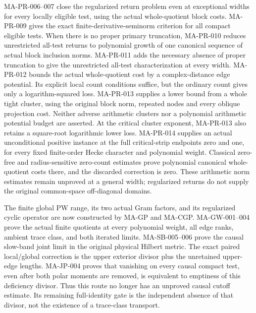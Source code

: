 \documentclass[11pt,a4paper]{article}
\begin{document}
MA-PR-006--007 close the regularized return problem even at
exceptional widths for every locally eligible test, using the
actual whole-quotient block costs. MA-PR-009 gives the exact
finite-derivative-seminorm criterion for all compact eligible
tests. When there is no proper primary truncation, MA-PR-010
reduces unrestricted all-test returns to polynomial growth of
one canonical sequence of actual block inclusion norms.
MA-PR-011 adds the necessary absence of proper truncation to give
the unrestricted all-test characterization at every width.
MA-PR-012 bounds the actual whole-quotient cost by a complex-distance
edge potential. Its explicit local count conditions suffice, but
the ordinary count gives only a logarithm-squared loss.
MA-PR-013 supplies a lower bound from a whole tight cluster,
using the original block norm, repeated nodes and every oblique
projection cost. Neither adverse arithmetic clusters nor a
polynomial arithmetic potential budget are asserted.
At the critical cluster exponent, MA-PR-013 also retains a
square-root logarithmic lower loss. MA-PR-014 supplies an actual
unconditional positive instance at the full critical-strip
endpoints zero and one, for every fixed finite-order Hecke
character and polynomial weight. Classical zero-free and
radius-sensitive zero-count estimates prove polynomial canonical
whole-quotient costs there, and the discarded correction is zero.
These arithmetic norm estimates remain unproved at a general
width; regularized returns do not supply the original
common-space off-diagonal domains.

The finite global PW range, its two actual Gram factors, and its
regularized cyclic operator are now constructed by MA-GP and
MA-CGP. MA-GW-001--004 prove the actual finite quotients at every
polynomial weight, all edge ranks, ambient trace class, and both
iterated limits. MA-SB-005--006 prove the causal slow-band joint
limit in the original physical Hilbert metric. The exact paired
local/global correction is the upper exterior divisor plus the
unretained upper-edge lengths. MA-JP-004 proves that vanishing
on every causal compact test, even after both polar moments are
removed, is equivalent to emptiness of this deficiency divisor.
Thus this route no longer has an unproved causal cutoff estimate.
Its remaining full-identity gate is the independent absence of
that divisor, not the existence of a trace-class transport.
\end{document}
